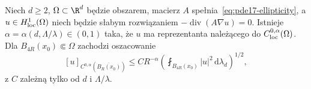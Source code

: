 \begin{twierdzenie}
\label{thm:pde17-holder}
Niech $d\ge2$, $\Omega\subset\R^d$ będzie obszarem,
macierz $A$ spełnia~\eqref{eq:pde17-ellipticity}, a
$u\in H^1_{\rm loc}(\Omega)$ niech będzie słabym rozwiązaniem
$-\operatorname{div}(A\nabla u)=0$.
Istnieje $\alpha=\alpha(d,\Lambda/\lambda)\in(0,1)$
taka, że $u$ ma reprezentanta należącego do $C^{0,\alpha}_{\rm loc}(\Omega)$.
Dla $B_{4R}(x_0)\Subset\Omega$ zachodzi oszacowanie
\begin{equation}\label{eq:pde17-holder}
 [u]_{C^{0,\alpha}(\overline{B_R(x_0)})}
 \le C R^{-\alpha}
 \left(\fint_{B_{4R}(x_0)}|u|^2\,\mathrm d\lambda_d\right)^{1/2},
\end{equation}
z $C$ zależną tylko od $d$ i $\Lambda/\lambda$.
\end{twierdzenie}
